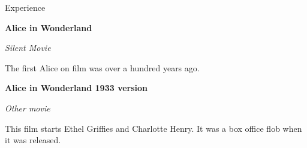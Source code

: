 \begin{rubric}{Experience}

		\textbf{Alice in Wonderland}\hfill
		\par
		\textit{Silent Movie}\par
    The first Alice on film was over a hundred years ago.

		\textbf{Alice in Wonderland 1933 version}\hfill
		\par
		\textit{Other movie}\par
    This film starts Ethel Griffies and Charlotte Henry. It was a box
    office flob when it was released.
\end{rubric}
